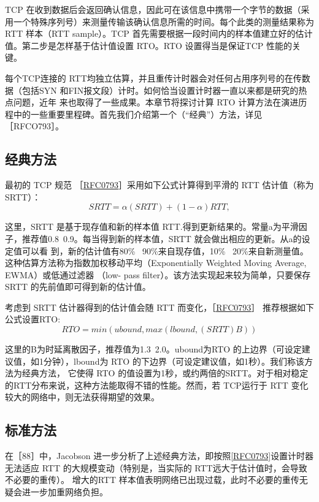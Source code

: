 TCP
在收到数据后会返回确认信息，因此可在该信息中携带一个字节的数据（采用一个特殊序列号）来测量传输该确认信息所需的时间。每个此类的测量结果称为 RTT 样本（RTT
sample）。TCP 首先需要根据一段时间内的样本值建立好的估计值。第二步是怎样基于估计值设置 RTO。RTO 设置得当是保证TCP 性能的关键。

每个TCP连接的 RTT均独立估算，并且重传计时器会对任何占用序列号的在传数据（包括SYN
和FIN报文段）计时。如何恰当设置计时器一直以来都是研究的热点问题，近年
来也取得了一些成果。本章节将探讨计算 RTO 计算方法在演进历程中的一些重要里程碑。首先我们介绍第一个（“经典”）方法，详见［RFCO793］。

\subsection{经典方法}
最初的 TCP 规范
［\href{https://datatracker.ietf.org/doc/html/rfc0793#section-3.7}{RFC0793}］采用如下公式计算得到平滑的
RTT 估计值（称为 SRTT）：
\begin{equation}
  SRTT = \alpha(SRTT) + (1 - \alpha) RTT,
\end{equation}

这里，SRTT 是基于现存值和新的样本值 RTT.得到更新结果的。常量a为平滑因子，推荐值0.8~0.9。每当得到新的样本值，SRTT
就会做出相应的更新。从a的设定值可以看
到，新的估计值有80\% ~90\%来自现存值，10\%
~20\%来自新测量值。这种估算方法称为指数加权移动平均（Exponentially Weighted Moving Average,
EWMA）或低通过滤器 （low-
pass filter）。该方法实现起来较为简单，只要保存SRTT 的先前值即可得到新的估计值。

考虑到 SRTT 估计器得到的估计值会随 RTT
而变化，［\href{https://datatracker.ietf.org/doc/html/rfc0793#section-3.7}{RFC0793}］
推荐根据如下公式设置RTO:
\begin{equation}
  RTO = min(ubound, max(lbound, (SRTT)B))
\end{equation}

这里的B为时延离散因子，推荐值为1.3~2.0。ubound为RTO 的上边界（可设定建议值，如1分钟），lbound为 RTO
的下边界（可设定建议值，如1秒）。我们称该方法为经典方法，
它使得 RTO 的值设置为1秒，或约两倍的SRTT。对于相对稳定的RTT分布来说，这种方法能取得不错的性能。然而，若 TCP运行于 RTT
变化较大的网络中，则无法获得期望的效果。

\subsection{标准方法}
在［88］中，Jacobson
进一步分析了上述经典方法，即按照\href{https://www.rfc-editor.org/rfc/rfc0793}{[RFC0793]}设置计时器无法适应
RTT 的大规模变动（特别是，当实际的 RTT远大于估计值时，会导致不必要的重传）。
增大的RTT 样本值表明网络已出现过载，此时不必要的重传无疑会进一步加重网络负担。

